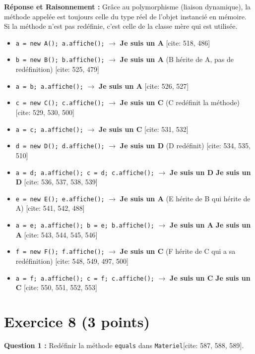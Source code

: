 \documentclass[11pt,a4paper]{article}
\begin{document}
\textbf{Réponse et Raisonnement :}
Grâce au polymorphisme (liaison dynamique), la méthode appelée est toujours celle du type réel de l'objet instancié en mémoire. Si la méthode n'est pas redéfinie, c'est celle de la classe mère qui est utilisée.
\begin{itemize}
    \item \texttt{a = new A(); a.affiche();} $\rightarrow$ \textbf{Je suis un A } [cite: 518, 486]
    \item \texttt{b = new B(); b.affiche();} $\rightarrow$ \textbf{Je suis un A } (B hérite de A, pas de redéfinition) [cite: 525, 479]
    \item \texttt{a = b; a.affiche();} $\rightarrow$ \textbf{Je suis un A } [cite: 526, 527]
    \item \texttt{c = new C(); c.affiche();} $\rightarrow$ \textbf{Je suis un C} (C redéfinit la méthode) [cite: 529, 530, 500]
    \item \texttt{a = c; a.affiche();} $\rightarrow$ \textbf{Je suis un C} [cite: 531, 532]
    \item \texttt{d = new D(); d.affiche();} $\rightarrow$ \textbf{Je suis un D} (D redéfinit) [cite: 534, 535, 510]
    \item \texttt{a = d; a.affiche(); c = d; c.affiche();} $\rightarrow$ \textbf{Je suis un D} \newline \textbf{Je suis un D} [cite: 536, 537, 538, 539]
    \item \texttt{e = new E(); e.affiche();} $\rightarrow$ \textbf{Je suis un A } (E hérite de B qui hérite de A) [cite: 541, 542, 488]
    \item \texttt{a = e; a.affiche(); b = e; b.affiche();} $\rightarrow$ \textbf{Je suis un A } \newline \textbf{Je suis un A } [cite: 543, 544, 545, 546]
    \item \texttt{f = new F(); f.affiche();} $\rightarrow$ \textbf{Je suis un C} (F hérite de C qui a sa redéfinition) [cite: 548, 549, 497, 500]
    \item \texttt{a = f; a.affiche(); c = f; c.affiche();} $\rightarrow$ \textbf{Je suis un C} \newline \textbf{Je suis un C} [cite: 550, 551, 552, 553]
\end{itemize}

\section*{Exercice 8 (3 points)}
\textbf{Question 1 :} Redéfinir la méthode \texttt{equals} dans \texttt{Materiel}[cite: 587, 588, 589].
\end{document}
